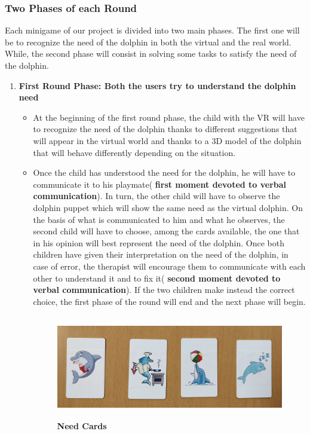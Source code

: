 \documentclass [12pt]{article}
\begin{document}
\subsubsection{Two Phases of each Round}
Each minigame of our project is divided into two main phases. 
The first one will be to recognize the need of the dolphin in both the virtual and the real world. While, the second phase  will consist in solving some tasks to satisfy the need of the dolphin.
\begin{enumerate}
\item  \textbf{First Round Phase: Both the users try to understand the dolphin need}
\begin{itemize}[•]
\item At the beginning of the first round phase, the child with the VR will have to recognize the need of the dolphin thanks to different suggestions that will appear in the virtual world and thanks to a 3D model of the dolphin that will behave differently depending on the situation.
\item Once the child has understood the need for the dolphin, he will have to communicate it to his playmate( \textbf{first moment devoted to verbal communication}). In turn, the other child will have to observe the dolphin puppet which will show the same need as the virtual dolphin. On the basis of what is communicated to him and what he observes, the second child will have to choose, among the cards available, the one that in his opinion will best represent the need of the dolphin. 
Once both children have given their interpretation on the need of the dolphin, in case of error, the therapist will encourage them to communicate with each other to understand it and to fix it( \textbf{second moment devoted to verbal communication}). If the two children make instead the correct choice, the first phase of the round will end and the next phase will begin.
\begin{figure}[ht!]
\centering
\includegraphics[height=4.5cm,width=10cm]{NeedCards.jpg}
\caption{\textbf{Need Cards}}
\end{figure}

\end{itemize}
\end{enumerate}
\end{document}
